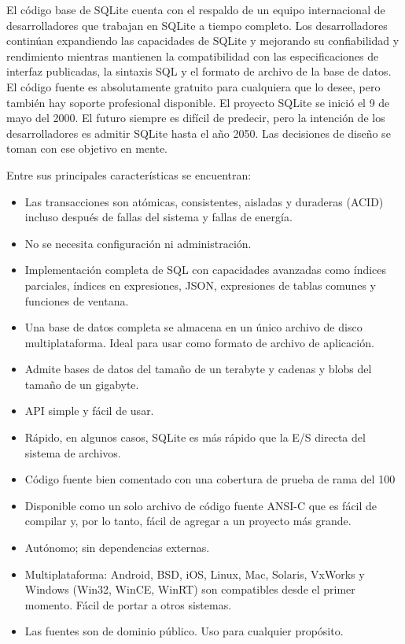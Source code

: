 El código base de SQLite cuenta con el respaldo de un equipo internacional de desarrolladores que trabajan en SQLite a tiempo completo. Los desarrolladores continúan expandiendo las capacidades de SQLite y mejorando su confiabilidad y rendimiento mientras mantienen la compatibilidad con las especificaciones de interfaz publicadas, la sintaxis SQL y el formato de archivo de la base de datos. El código fuente es absolutamente gratuito para cualquiera que lo desee, pero también hay soporte profesional disponible. El proyecto SQLite se inició el 9 de mayo del 2000. El futuro siempre es difícil de predecir, pero la intención de los desarrolladores es admitir SQLite hasta el año 2050. Las decisiones de diseño se toman con ese objetivo en mente.

Entre sus principales características se encuentran:
\begin{itemize}

\item	Las transacciones son atómicas, consistentes, aisladas y duraderas (ACID) incluso después de fallas del sistema y fallas de energía.
\item	No se necesita configuración ni administración.
\item	Implementación completa de SQL con capacidades avanzadas como índices parciales, índices en expresiones, JSON, expresiones de tablas comunes y funciones de ventana.
\item	Una base de datos completa se almacena en un único archivo de disco multiplataforma. Ideal para usar como formato de archivo de aplicación.
\item	Admite bases de datos del tamaño de un terabyte y cadenas y blobs del tamaño de un gigabyte.
\item	API simple y fácil de usar.
\item	Rápido, en algunos casos, SQLite es más rápido que la E/S directa del sistema de archivos.
\item	Código fuente bien comentado con una cobertura de prueba de rama del 100 %
\item	Disponible como un solo archivo de código fuente ANSI-C que es fácil de compilar y, por lo tanto, fácil de agregar a un proyecto más grande.
\item	Autónomo; sin dependencias externas.
\item	Multiplataforma: Android, BSD, iOS, Linux, Mac, Solaris, VxWorks y Windows (Win32, WinCE, WinRT) son compatibles desde el primer momento. Fácil de portar a otros sistemas.
\item	Las fuentes son de dominio público. Uso para cualquier propósito.
\end{itemize}

